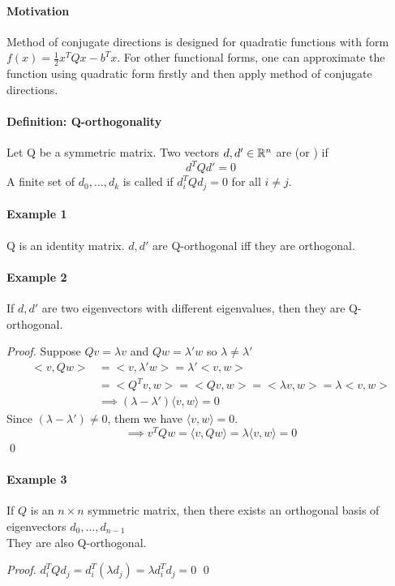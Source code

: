 \documentclass[11pt]{article}
\begin{document}
\paragraph{Motivation}
Method of conjugate directions is designed for quadratic functions with form $f(x) = \frac{1}{2}x^TQx - b^Tx$. For other functional forms, one can approximate the function using quadratic form firstly and then apply method of conjugate directions.

\paragraph{Definition: Q-orthogonality}
Let Q be a symmetric matrix. Two vectors $d, d' \in \mathbb{R}^n$ are  (or ) if $$d^TQd' = 0$$
A finite set of $d_0, \hdots, d_k$ is called  if $d_i^TQd_j = 0$ for all $i \neq j$.

\paragraph{Example 1}
Q is an identity matrix. $d, d'$ are Q-orthogonal iff they are orthogonal.

\paragraph{Example 2}
If $d, d'$ are two eigenvectors with different eigenvalues, then they are Q-orthogonal. \\
\begin{proof}
Suppose $Qv = \lambda v$ and $Qw = \lambda' w$ so $\lambda \neq \lambda'$
	\begin{align}
		<v, Qw> &= <v, \lambda'w> = \lambda'<v,w> \\
		&= <Q^Tv, w> = <Qv, w> = <\lambda v, w> = \lambda <v,w>\\
		&\implies (\lambda - \lambda')\langle v, w \rangle  = 0
	\end{align}
	Since $(\lambda - \lambda') \neq 0$, them we have $\langle v, w \rangle  = 0$.
	$$\implies v^TQw = \langle v, Qw \rangle = \lambda \langle v, w \rangle  = 0$$\qed
\end{proof}

\paragraph{Example 3}
If $Q$ is an $n \times n$ symmetric matrix, then there exists an orthogonal basis of eigenvectors $d_0, \hdots, d_{n-1}$ \\
 They are also Q-orthogonal. \\
\begin{proof}
	$d_i^TQd_j = d_i^T(\lambda d_j) = \lambda d_i^Td_j = 0$ \qed
\end{proof}
\end{document}
